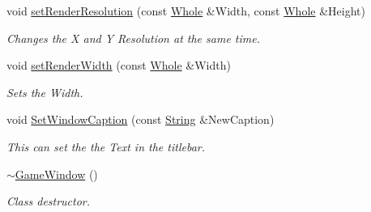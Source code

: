 \begin{DoxyCompactItemize}
void \hyperlink{classMezzanine_1_1GameWindow_abf4ede4f1d14639017d8cd4da7490b44}{setRenderResolution} (const \hyperlink{namespaceMezzanine_adcbb6ce6d1eb4379d109e51171e2e493}{Whole} \&Width, const \hyperlink{namespaceMezzanine_adcbb6ce6d1eb4379d109e51171e2e493}{Whole} \&Height)
\begin{DoxyCompactList}\small\item\em Changes the X and Y Resolution at the same time. \item\end{DoxyCompactList}\item 
void \hyperlink{classMezzanine_1_1GameWindow_a9228766fbdf9fc77b104647e49226a0d}{setRenderWidth} (const \hyperlink{namespaceMezzanine_adcbb6ce6d1eb4379d109e51171e2e493}{Whole} \&Width)
\begin{DoxyCompactList}\small\item\em Sets the Width. \item\end{DoxyCompactList}\item 
void \hyperlink{classMezzanine_1_1GameWindow_ab115ae2f4af6e3136208bb6d20433b97}{SetWindowCaption} (const \hyperlink{namespaceMezzanine_acf9fcc130e6ebf08e3d8491aebcf1c86}{String} \&NewCaption)
\begin{DoxyCompactList}\small\item\em This can set the the Text in the titlebar. \item\end{DoxyCompactList}\item 
\hypertarget{classMezzanine_1_1GameWindow_a39986f43fb1370d6458b20958a915535}{
\hyperlink{classMezzanine_1_1GameWindow_a39986f43fb1370d6458b20958a915535}{$\sim$GameWindow} ()}
\label{classMezzanine_1_1GameWindow_a39986f43fb1370d6458b20958a915535}

\begin{DoxyCompactList}\small\item\em Class destructor. \item\end{DoxyCompactList}\end{DoxyCompactItemize}
